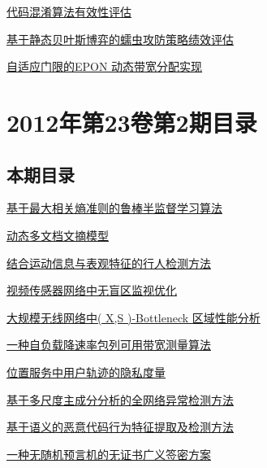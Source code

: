 \documentclass[a4paper]{article}
\begin{document}
\href{http://www.jos.org.cn/ch/reader/download_pdf.aspx?file_no=3994&year_id=2012&quarter_id=3&falg=1}{代码混淆算法有效性评估}

\href{http://www.jos.org.cn/ch/reader/download_pdf.aspx?file_no=3997&year_id=2012&quarter_id=3&falg=1}{基于静态贝叶斯博弈的蠕虫攻防策略绩效评估}

\href{http://www.jos.org.cn/ch/reader/download_pdf.aspx?file_no=4038&year_id=2012&quarter_id=3&falg=1}{自适应门限的EPON 动态带宽分配实现}


\section{\textbf{2012年第23卷第2期目录}}
\subsection{本期目录}
\href{http://www.jos.org.cn/ch/reader/download_pdf.aspx?file_no=3977&year_id=2012&quarter_id=2&falg=1}{基于最大相关熵准则的鲁棒半监督学习算法}

\href{http://www.jos.org.cn/ch/reader/download_pdf.aspx?file_no=3999&year_id=2012&quarter_id=2&falg=1}{动态多文档文摘模型}

\href{http://www.jos.org.cn/ch/reader/download_pdf.aspx?file_no=4030&year_id=2012&quarter_id=2&falg=1}{结合运动信息与表观特征的行人检测方法}

\href{http://www.jos.org.cn/ch/reader/download_pdf.aspx?file_no=3975&year_id=2012&quarter_id=2&falg=1}{视频传感器网络中无盲区监视优化}

\href{http://www.jos.org.cn/ch/reader/download_pdf.aspx?file_no=3968&year_id=2012&quarter_id=2&falg=1}{大规模无线网络中( X,S )-Bottleneck 区域性能分析}

\href{http://www.jos.org.cn/ch/reader/download_pdf.aspx?file_no=3965&year_id=2012&quarter_id=2&falg=1}{一种自负载降速率包列可用带宽测量算法}

\href{http://www.jos.org.cn/ch/reader/download_pdf.aspx?file_no=3946&year_id=2012&quarter_id=2&falg=1}{位置服务中用户轨迹的隐私度量}

\href{http://www.jos.org.cn/ch/reader/download_pdf.aspx?file_no=3952&year_id=2012&quarter_id=2&falg=1}{基于多尺度主成分分析的全网络异常检测方法}

\href{http://www.jos.org.cn/ch/reader/download_pdf.aspx?file_no=3953&year_id=2012&quarter_id=2&falg=1}{基于语义的恶意代码行为特征提取及检测方法}

\href{http://www.jos.org.cn/ch/reader/download_pdf.aspx?file_no=3947&year_id=2012&quarter_id=2&falg=1}{一种无随机预言机的无证书广义签密方案}
\end{document}
